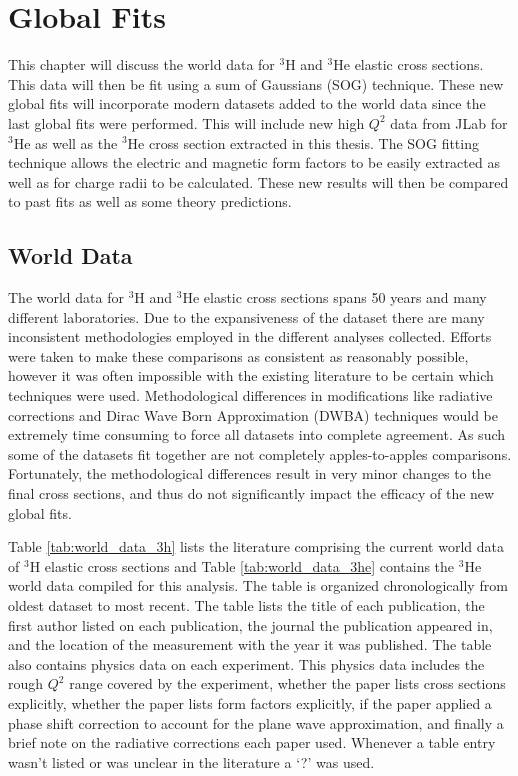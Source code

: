 \chapter{Global Fits} %
\label{ch:global_fits} %

This chapter will discuss the world data for $^3$H and $^3$He elastic cross sections. This data will then be fit using a sum of Gaussians (SOG) technique. These new global fits will incorporate modern datasets added to the world data since the last global fits were performed. This will include new high $Q^2$ data from JLab for $^3$He as well as the $^3$He cross section extracted in this thesis. The SOG fitting technique allows the electric and magnetic form factors to be easily extracted as well as for charge radii to be calculated. These new results will then be compared to past fits as well as some theory predictions.

\section{World Data}
\label{sec:world_data}

The world data for $^3$H and $^3$He elastic cross sections spans 50 years and many different laboratories. Due to the expansiveness of the dataset there are many inconsistent methodologies employed in the different analyses collected. Efforts were taken to make these comparisons as consistent as reasonably possible, however it was often impossible with the existing literature to be certain which techniques were used. Methodological differences in modifications like radiative corrections and Dirac Wave Born Approximation (DWBA) techniques would be extremely time consuming to force all datasets into complete agreement. As such some of the datasets fit together are not completely apples-to-apples comparisons. Fortunately, the methodological differences result in very minor changes to the final cross sections, and thus do not significantly impact the efficacy of the new global fits.

Table \ref{tab:world_data_3h} lists the literature comprising the current world data of $^3$H elastic cross sections and Table \ref{tab:world_data_3he} contains the $^3$He world data compiled for this analysis. The table is organized chronologically from oldest dataset to most recent. The table lists the title of each publication, the first author listed on each publication, the journal the publication appeared in, and the location of the measurement with the year it was published. The table also contains physics data on each experiment. This physics data includes the rough $Q^2$ range covered by the experiment, whether the paper lists cross sections explicitly, whether the paper lists form factors explicitly, if the paper applied a phase shift correction to account for the plane wave approximation, and finally a brief note on the radiative corrections each paper used. Whenever a table entry wasn't listed or was unclear in the literature a `?' was used.
 

